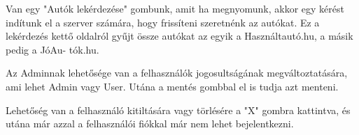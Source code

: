 Van egy "Autók lekérdezése" gombunk, amit ha megnyomunk,  akkor egy kérést indítunk el a szerver számára, hogy frissíteni szeretnénk az autókat. Ez a lekérdezés kettő oldalról gyűjt össze autókat az egyik a Használtautó.hu, a másik pedig a JóAu-
tók.hu.

Az Adminnak lehetősége van a felhasználók jogosultságának megváltoztatására, ami lehet Admin vagy User. Utána a mentés gombbal el is tudja azt menteni.

Lehetőség van a felhasználó kitiltására vagy törlésére a "X" gombra kattintva, és utána már azzal a felhasználói fiókkal már nem lehet bejelentkezni.


